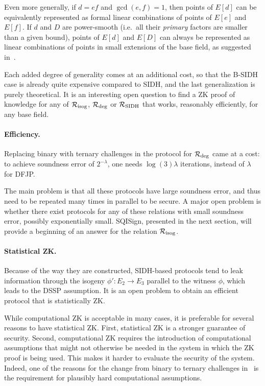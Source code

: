 Even more generally, if $d = ef$ and $\gcd(e,f)=1$, then points of $E[d]$ can be equivalently represented as formal linear combinations of points of $E[e]$ and $E[f]$.
If $d$ and $D$ are power-smooth (i.e.\ all their \emph{primary} factors are smaller than a given bound), points of $E[d]$ and $E[D]$ can always be represented as linear combinations of points in small extensions of the base field, as suggested in~\cite{GPS20}.

Each added degree of generality comes at an additional cost, so that the B-SIDH case is already quite expensive compared to SIDH, and the last generalization is purely theoretical.
It is an interesting open question to find a ZK proof of knowledge for any of $\R[isog]$, $\R[deg]$ or $\R[SIDH]$ that works, reasonably efficiently, for any base field.

\paragraph{Efficiency.}
Replacing binary with ternary challenges in the protocol for $\R[deg]$ came at a cost: to achieve soundness error of $2^{-\lambda}$, one needs $\log(3) \lambda$ iterations, instead of $\lambda$ for DFJP.

The main problem is that all these protocols have large soundness error, and thus need to be repeated many times in parallel to be secure.
A major open problem is whether there exist protocols for any of these relations with small soundness error, possibly exponentially small.
SQISign, presented in the next section, will provide a beginning of an answer for the relation $\R[isog]$.

\paragraph{Statistical ZK.}
Because of the way they are constructed, SIDH-based protocols tend to leak information through the isogeny $\phi':E_2 \to E_3$ parallel to the witness $\phi$, which leads to the DSSP assumption. It is an open problem to obtain an efficient protocol that is statistically ZK.


While computational ZK is acceptable in many cases, it is preferable for several reasons to have statistical ZK.
First, statistical ZK is a stronger guarantee of security.
Second, computational ZK requires the introduction of computational assumptions that might not otherwise be needed in the system in which the ZK proof is being used.
This makes it harder to evaluate the security of the system.
Indeed, one of the reasons for the change from binary to ternary challenges in~\cite{DFDGZ21} is the requirement for plausibly hard computational assumptions.

